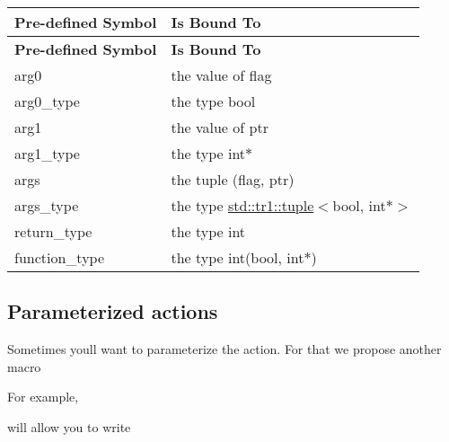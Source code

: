 \tabulinesep=1mm
\begin{longtabu}spread 0pt [c]{*{2}{|X[-1]}|}
\hline
\cellcolor{\tableheadbgcolor}\textbf{ {\bfseries{Pre-\/defined Symbol}}  }&\cellcolor{\tableheadbgcolor}\textbf{ {\bfseries{Is Bound To}}   }\\
\endfirsthead
\hline
\endfoot
\hline
\cellcolor{\tableheadbgcolor}\textbf{ {\bfseries{Pre-\/defined Symbol}}  }&\cellcolor{\tableheadbgcolor}\textbf{ {\bfseries{Is Bound To}}   }\\
\endhead
{\ttfamily arg0}  &the value of {\ttfamily flag}   \\
{\ttfamily arg0\+\_\+type}  &the type {\ttfamily bool}   \\
{\ttfamily arg1}  &the value of {\ttfamily ptr}   \\
{\ttfamily arg1\+\_\+type}  &the type {\ttfamily int$\ast$}   \\
{\ttfamily args}  &the tuple {\ttfamily (flag, ptr)}   \\
{\ttfamily args\+\_\+type}  &the type {\ttfamily \mbox{\hyperlink{classstd_1_1tr1_1_1tuple}{std\+::tr1\+::tuple}}$<$bool, int$\ast$$>$}   \\
{\ttfamily return\+\_\+type}  &the type {\ttfamily int}   \\
{\ttfamily function\+\_\+type}  &the type {\ttfamily int(bool, int$\ast$)}   \\
\end{longtabu}


\subsection*{Parameterized actions}

Sometimes you\textquotesingle{}ll want to parameterize the action. For that we propose another macro 
\begin{DoxyCode}{0}
\end{DoxyCode}


For example, 
\begin{DoxyCode}{0}
\end{DoxyCode}
 will allow you to write 
\begin{DoxyCode}{0}
\DoxyCodeLine{\textcolor{comment}{// Returns argument \#0 + 5.}}
\end{DoxyCode}


